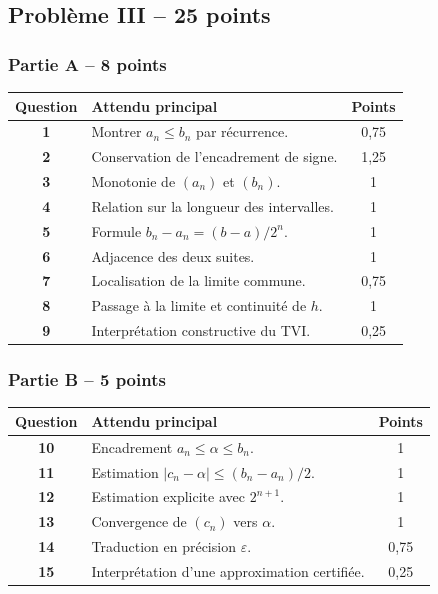 \documentclass[11pt,a4paper]{article}
\begin{document}

\subsection*{Problème III -- 25 points}

\subsubsection*{Partie A -- 8 points}

\begin{tabularx}{\linewidth}{>{\bfseries}c X c}
\toprule
Question & Attendu principal & Points \\
\midrule
1 & Montrer \(a_n\leq b_n\) par récurrence. & 0,75 \\
2 & Conservation de l'encadrement de signe. & 1,25 \\
3 & Monotonie de \((a_n)\) et \((b_n)\). & 1 \\
4 & Relation sur la longueur des intervalles. & 1 \\
5 & Formule \(b_n-a_n=(b-a)/2^n\). & 1 \\
6 & Adjacence des deux suites. & 1 \\
7 & Localisation de la limite commune. & 0,75 \\
8 & Passage à la limite et continuité de \(h\). & 1 \\
9 & Interprétation constructive du TVI. & 0,25 \\
\bottomrule
\end{tabularx}

\subsubsection*{Partie B -- 5 points}

\begin{tabularx}{\linewidth}{>{\bfseries}c X c}
\toprule
Question & Attendu principal & Points \\
\midrule
10 & Encadrement \(a_n\leq\alpha\leq b_n\). & 1 \\
11 & Estimation \(|c_n-\alpha|\leq (b_n-a_n)/2\). & 1 \\
12 & Estimation explicite avec \(2^{n+1}\). & 1 \\
13 & Convergence de \((c_n)\) vers \(\alpha\). & 1 \\
14 & Traduction en précision \(\varepsilon\). & 0,75 \\
15 & Interprétation d'une approximation certifiée. & 0,25 \\
\bottomrule
\end{tabularx}
\end{document}
